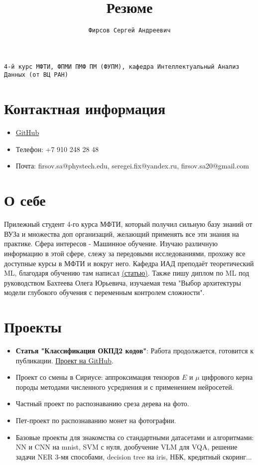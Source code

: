 \documentclass{article}
\title{\textbf{Резюме}}
\author{\texttt{Фирсов Сергей Андреевич}}
\date{}
\begin{document}
\maketitle


\texttt{4-й курс МФТИ, ФПМИ ПМФ ПМ (ФУПМ), кафедра Интеллектуальный Анализ Данных (от ВЦ РАН)}

\section*{Контактная информация}
\begin{itemize}
    \item \href{https://github.com/Schaft-s}{GitHub}
    \item Телефон: +7 910 248 28 48
    \item Почта: firsov.sa@phystech.edu, seregei.fix@yandex.ru, firsov.sa20@gmail.com
\end{itemize}

\section*{О себе}
Прилежный студент 4-го курса МФТИ, который получил сильную базу знаний от ВУЗа и множества доп организаций, желающий применять все эти знания на практике. Сфера интересов - Машинное обучение. Изучаю различную информацию в этой сфере, слежу за передовыми исследованиями, прохожу все доступные курсы в МФТИ и вокруг него. Кафедра ИАД преподаёт теоретический ML, благодаря обучению там написал  \href{https://github.com/intsystems/2024-Project-142}{(статью)}. Также пишу диплом по ML под руководством Бахтеева Олега Юрьевича, изучаемая тема "Выбор архитектуры модели глубокого обучения с переменным контролем сложности".

\section*{Проекты}
\begin{itemize}
    \item \textbf{Статья "Классификация ОКПД2 кодов"}: Работа продолжается, готовится к публикации. \href{https://github.com/intsystems/2024-Project-142}{Проект на GitHub}.
    \item Проект со смены в Сириусе: аппроксимация тензоров \(E\) и \(\mu\) цифрового керна породы методами численного усреднения и с применением нейросетей.
    \item Частный проект по распознаванию среза дерева на фото.
    \item Пет-проект по распознаванию монет на фотографии.
    \item Базовые проекты для знакомства со стандартными датасетами и алгоритмами: NN и CNN на mnist, SVM с нуля, дообучение VLM для VQA, решение задачи NER 3-мя способами, decision tree на iris, НБК, кредитный скоринг...
\end{itemize}
\end{document}
